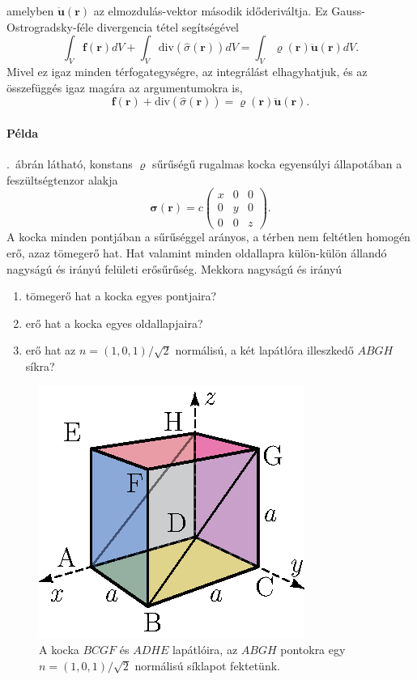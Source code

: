 \documentclass[12pt,a4paper]{scrartcl}
\let\mathbf\bm
\begin{document}
amelyben ${\mathbf{\ddot u\left({\mathbf{r}}\right)}}$ az elmozdulás-vektor második időderiváltja. Ez Gauss-Ostrogradsky-féle divergencia tétel segítségével
\[\int_V {{\mathbf{f}}\left( {\mathbf{r}} \right)dV}  + \int_V {{\text{div}}\left( {\hat \sigma \left( {\mathbf{r}} \right)} \right)dV}  = \int_V {\varrho \left( {\mathbf{r}} \right){\mathbf{\ddot u\left({\mathbf{r}}\right)}}dV} .\]
Mivel ez igaz minden térfogategységre, az integrálást elhagyhatjuk, és az összefüggés igaz magára az argumentumokra is,
\begin{equation}
{\mathbf{f}}\left( {\mathbf{r}} \right) + {\text{div}}\left( {\hat \sigma \left( {\mathbf{r}} \right)} \right) = \varrho \left( {\mathbf{r}} \right){\mathbf{\ddot u\left({\mathbf{r}}\right)}}.
\end{equation}

\footnotesize
\paragraph{Példa}
.\ ábrán látható, konstans $\varrho$ sűrűségű rugalmas kocka egyensúlyi állapotában a feszültségtenzor alakja 
\[{\mathbf{\sigma }}\left( {\mathbf{r}} \right) = c \left( {\begin{array}{*{20}{c}}
  {{x}}&0&0 \\ 
  0&{{y}}&0 \\ 
  0&0&{{z}} 
\end{array}} \right).\]
A kocka minden pontjában a sűrűséggel arányos, a térben nem feltétlen homogén erő, azaz tömegerő hat. Hat valamint minden oldallapra külön-külön állandó nagyságú és irányú felületi erősűrűség. Mekkora nagyságú és irányú
\begin{enumerate}
\item tömegerő hat a kocka egyes pontjaira?
\item erő hat a kocka egyes oldallapjaira?
\item erő hat az $n = \left( {1,0,1} \right)/\sqrt 2 $ normálisú, a két lapátlóra illeszkedő $ABGH$ síkra?
\end{enumerate}
\begin{figure}[htb] 
\centering    
\includegraphics[scale=1]{figs/kocka_atloval.eps}
\caption{A kocka $BCGF$ és $ADHE$ lapátlóira, az $ABGH$ pontokra egy $n = \left( {1,0,1} \right)/\sqrt 2 $ normálisú síklapot fektetünk. }
\label{fig:kocka_atloval}
\end{figure}
\FloatBarrier
\end{document}
